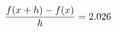 \documentclass[preview]{standalone}
\begin{document}
\begin{align*}
\special{dvisvgm:raw <g id='unique000'>}\frac{f(x+h)-f(x)}{h} = 2.026\special{dvisvgm:raw </g>}
\end{align*}
\end{document}
